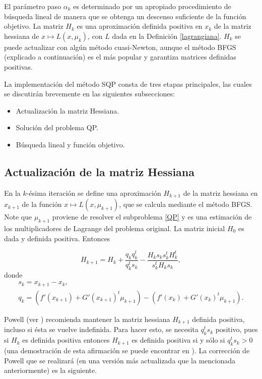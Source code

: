 \documentclass[a4paper,10pt]{book}
\begin{document}
El parámetro paso $\alpha_k$ es determinado por un apropiado procedimiento de búsqueda lineal de manera que se obtenga un descenso suficiente de la función objetivo. La matriz $H_k$ es una aproximación definida positiva en $x_k$ de la matriz hessiana de $x\mapsto L(x,\mu_k)$, con $L$ dada en la Definición \ref{lagrangiana}. $H_k$ se puede actualizar con algún método cuasi-Newton, aunque el método BFGS (explicado a continuación) es el más popular y garantiza matrices definidas positivas.

La implementación del método SQP consta de tres etapas principales, las cuales se discutirán brevemente en las siguientes subsecciones:
\begin{itemize}
    \item Actualización la matriz Hessiana.
    \item Solución del problema QP.
    \item Búsqueda lineal y función objetivo.
\end{itemize}

\subsection{Actualización de la matriz Hessiana}
En la $k$-ésima iteración se define una aproximación $H_{k+1}$ de la matriz hessiana en $x_{k+1}$ de la función $x\mapsto L(x,\mu_{k+1})$, que se calcula mediante el método BFGS. Note que $\mu_{k+1}$ proviene de resolver el subproblema \eqref{QP} y es una estimación de los multiplicadores de Lagrange del problema original. La matriz inicial $H_0$ es dada y definida positiva. Entonces

\begin{equation}\label{actmatriz}
    H_{k+1}=H_k+\frac{q_kq_k^t}{q_k^ts_k}-\frac{H_ks_ks_k^tH_k^t}{s_k^tH_ks_k},
\end{equation}
donde 
\begin{equation}\label{coefbfgs}
    \begin{array}{c}
    s_k=x_{k+1}-x_k,\\
    q_k=\left(f'(x_{k+1})+G'(x_{k+1})^t\mu_{k+1}\right)-\left( f'(x_k)+G'(x_k)^t\mu_{k+1}\right).
    \end{array}
\end{equation}

Powell (ver \cite{powell1978fast}) recomienda mantener la matriz hessiana $H_{k+1}$ definida positiva, incluso si ésta se vuelve indefinida. Para hacer esto, se necesita $q_k^ts_k$ positivo, pues si $H_k$ es definida positiva entonces $H_{k+1}$ es definida positiva si y sólo si $q_k^ts_k>0$ (una demostración de esta afirmación se puede encontrar en \cite[Theorem 4.5.]{bonnans2006numerical}). La corrección de Powell que se realizará (en una versión más actualizada que la mencionada anteriormente) es la siguiente.
\end{document}
